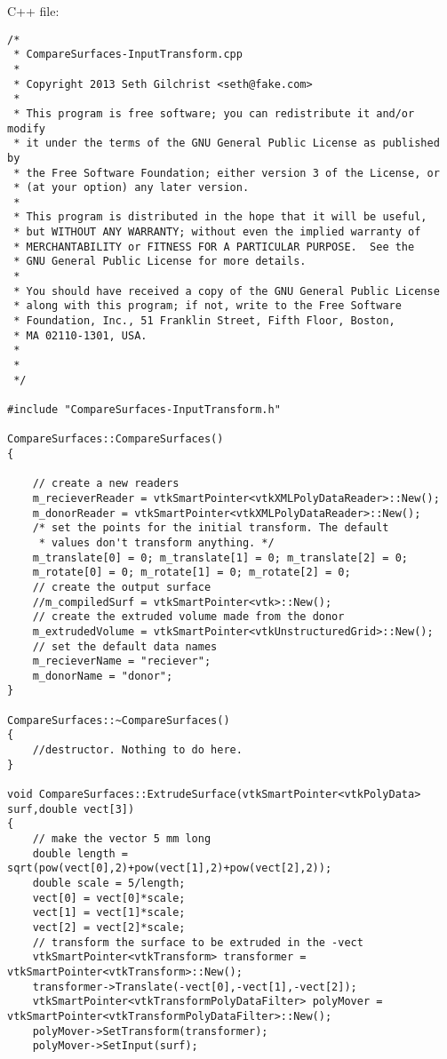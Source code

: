 C++ file:
\begin{lstlisting}
/*
 * CompareSurfaces-InputTransform.cpp
 *
 * Copyright 2013 Seth Gilchrist <seth@fake.com>
 *
 * This program is free software; you can redistribute it and/or modify
 * it under the terms of the GNU General Public License as published by
 * the Free Software Foundation; either version 3 of the License, or
 * (at your option) any later version.
 *
 * This program is distributed in the hope that it will be useful,
 * but WITHOUT ANY WARRANTY; without even the implied warranty of
 * MERCHANTABILITY or FITNESS FOR A PARTICULAR PURPOSE.  See the
 * GNU General Public License for more details.
 *
 * You should have received a copy of the GNU General Public License
 * along with this program; if not, write to the Free Software
 * Foundation, Inc., 51 Franklin Street, Fifth Floor, Boston,
 * MA 02110-1301, USA.
 *
 *
 */

#include "CompareSurfaces-InputTransform.h"

CompareSurfaces::CompareSurfaces()
{

    // create a new readers
    m_recieverReader = vtkSmartPointer<vtkXMLPolyDataReader>::New();
    m_donorReader = vtkSmartPointer<vtkXMLPolyDataReader>::New();
    /* set the points for the initial transform. The default
     * values don't transform anything. */
    m_translate[0] = 0; m_translate[1] = 0; m_translate[2] = 0;
    m_rotate[0] = 0; m_rotate[1] = 0; m_rotate[2] = 0;
    // create the output surface
    //m_compiledSurf = vtkSmartPointer<vtk>::New();
    // create the extruded volume made from the donor
    m_extrudedVolume = vtkSmartPointer<vtkUnstructuredGrid>::New();
    // set the default data names
    m_recieverName = "reciever";
    m_donorName = "donor";
}

CompareSurfaces::~CompareSurfaces()
{
    //destructor. Nothing to do here.
}

void CompareSurfaces::ExtrudeSurface(vtkSmartPointer<vtkPolyData> surf,double vect[3])
{
    // make the vector 5 mm long
    double length = sqrt(pow(vect[0],2)+pow(vect[1],2)+pow(vect[2],2));
    double scale = 5/length;
    vect[0] = vect[0]*scale;
    vect[1] = vect[1]*scale;
    vect[2] = vect[2]*scale;
    // transform the surface to be extruded in the -vect
    vtkSmartPointer<vtkTransform> transformer = vtkSmartPointer<vtkTransform>::New();
    transformer->Translate(-vect[0],-vect[1],-vect[2]);
    vtkSmartPointer<vtkTransformPolyDataFilter> polyMover = vtkSmartPointer<vtkTransformPolyDataFilter>::New();
    polyMover->SetTransform(transformer);
    polyMover->SetInput(surf);


\end{lstlisting}
